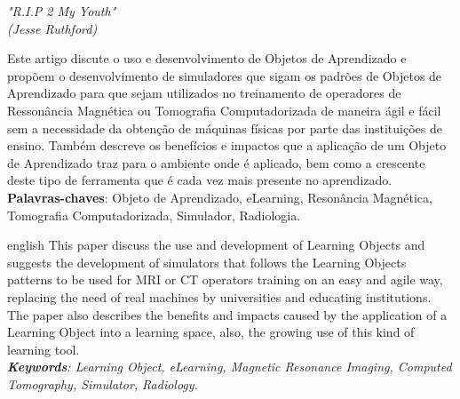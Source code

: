 \documentclass[12pt,openright,oneside,a4paper,english,french,spanish,brazil]{unifil}
\begin{document}
\begin{epigrafe}
\vspace*{\fill}
\begin{flushright}
\textit{"R.I.P 2 My Youth" \\
(Jesse Ruthford)}
\end{flushright}
\end{epigrafe}

\par
\begin{resumo}
Este artigo discute o uso e desenvolvimento de Objetos de Aprendizado e propõem o desenvolvimento de simuladores que sigam os padrões de Objetos de Aprendizado para que sejam utilizados no treinamento de operadores de Ressonância Magnética ou Tomografia Computadorizada de maneira ágil e fácil sem a necessidade da obtenção de máquinas físicas por parte das instituições de ensino. Também descreve os benefícios e impactos que a aplicação de um Objeto de Aprendizado traz para o ambiente onde é aplicado, bem como a crescente deste tipo de ferramenta que é cada vez mais presente no aprendizado.
\vspace{\onelineskip} \\
\noindent
\textbf{Palavras-chaves}: Objeto de Aprendizado, eLearning, Resonância Magnética, Tomografia Computadorizada, Simulador, Radiologia.
\end{resumo}

\par
\begin{resumo}[Abstract]
\begin{otherlanguage*}{english}
This paper discuss the use and development of Learning Objects and suggests the development of simulators that follows the Learning Objects patterns to be used for MRI or CT operators training on an easy and agile way, replacing the need of real machines by universities and educating institutions. The paper also describes the benefits and impacts caused by the application of a Learning Object into a learning space, also, the growing use of this kind of learning tool.
\emph{
}
\vspace{\onelineskip}\\
\noindent
\emph{	
\textbf{Keywords}: Learning Object, eLearning, Magnetic Resonance Imaging, Computed Tomography, Simulator, Radiology.
}
\end{otherlanguage*}
\end{resumo}
\end{document}
